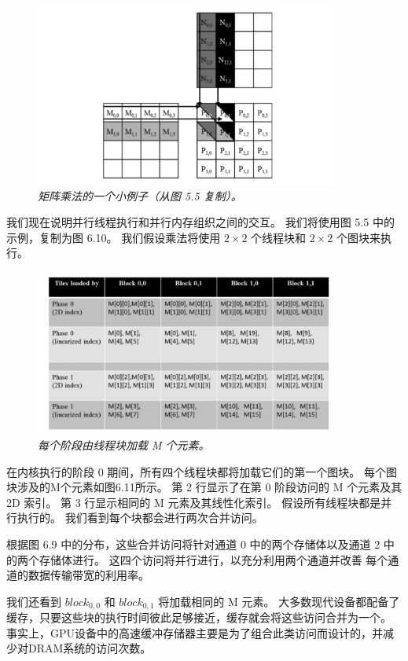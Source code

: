 \begin{figure}[H]
	\centering
	\includegraphics[width=0.9\textwidth]{figs/F6.10.png}
	\caption{\textit{矩阵乘法的一个小例子（从图 5.5 复制）。}}
\end{figure}

我们现在说明并行线程执行和并行内存组织之间的交互。 我们将使用图 5.5 中的示例，复制为图 6.10。 
我们假设乘法将使用 $2 \times 2$ 个线程块和 $2 \times 2$ 个图块来执行。

\begin{figure}[H]
	\centering
	\includegraphics[width=0.9\textwidth]{figs/F6.11.png}
	\caption{\textit{每个阶段由线程块加载 M 个元素。}}
\end{figure}

在内核执行的阶段 0 期间，所有四个线程块都将加载它们的第一个图块。 每个图块涉及的M个元素如图6.11所示。 
第 2 行显示了在第 0 阶段访问的 M 个元素及其 2D 索引。 第 3 行显示相同的 M 元素及其线性化索引。 
假设所有线程块都是并行执行的。 我们看到每个块都会进行两次合并访问。

根据图 6.9 中的分布，这些合并访问将针对通道 0 中的两个存储体以及通道 2 中的两个存储体进行。
这四个访问将并行进行，以充分利用两个通道并改善 每个通道的数据传输带宽的利用率。

我们还看到 $block_{0,0}$ 和 $block_{0,1}$ 将加载相同的 M 元素。 
大多数现代设备都配备了缓存，只要这些块的执行时间彼此足够接近，缓存就会将这些访问合并为一个。 
事实上，GPU设备中的高速缓冲存储器主要是为了组合此类访问而设计的，并减少对DRAM系统的访问次数。

